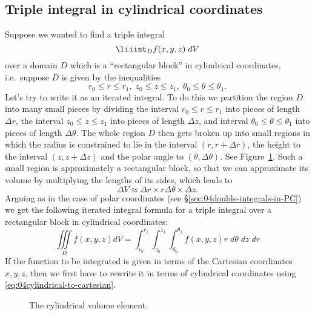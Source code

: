 \subsection{Triple integral in cylindrical coordinates}  
Suppose we wanted to find a triple integral
\[
 \liiint_D f(x,y,z)\;dV 
\]
over a domain $D$ which is a ``rectangular block'' in cylindrical coordinates,
i.e.\ suppose $D$ is given by the inequalities
\[
r_0\le r\le r_1, \; z_0\le z\le z_1, \; \theta_0\le \theta\le\theta_1.
\]
Let's try to write it as an iterated integral.  To do this we partition
the region $D$ into many small pieces by dividing the interval $r_0\le
r\le r_1$ into pieces of length $\Delta r$, the interval $z_0 \le z\le
z_1$ into pieces of length $\Delta z$, and interval $\theta_0 \le
\theta\le \theta_1$ into pieces of length $\Delta \theta$.  The whole
region $D$ then gets broken up into small regions in which the radius
is constrained to lie in the interval $(r, r+\Delta r)$, the height
to the interval $(z, z+\Delta z)$ and the polar angle to $(\theta,
\Delta\theta)$.  See Figure~\ref{fig:04cylindrical-volume-element}.
Such a small region is approximately a rectangular block, so that we
can approximate its volume by multiplying the lengths of its sides,
which leads to
\[
\Delta V \approx \Delta r\times r\Delta\theta \times \Delta z.
\]
Arguing as in the case of polar coordinates (see
\S\ref{sec:04double-integrals-in-PC}) we get the following
iterated integral formula for a triple integral over a rectangular
block in cylindrical coordinates:
\begin{equation}
    \iiint\limits_D f(x, y, z) dV
    = 
    \int_{r_0}^{r_1} \int_{z_0}^{z_1} \int_{\theta_0}^{\theta_1}
    f(x, y, z)
    r\;  d\theta\; dz\; dr
    \label{eq:04-tripleint-cylindrical}
\end{equation}
If the function to be integrated is given in terms of the Cartesian
coordinates $x, y, z$, then we first have to rewrite it in terms of
cylindrical coordinates using \eqref{eq:04cylindrical-to-cartesian}.
\begin{figure}[t]
  
  \caption{The cylindrical volume element.}
  \label{fig:04cylindrical-volume-element}
\end{figure}


